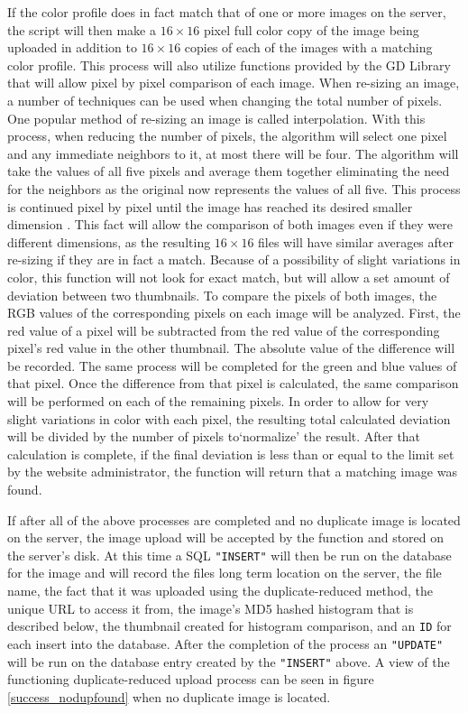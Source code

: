 If the color profile does in fact match that of one or more images on the server, the script will then make a $16\times16$ pixel full color copy of the image being uploaded in addition to $16\times16$ copies of each of the images with a matching color profile. This process will also utilize functions provided by the GD Library that will allow pixel by pixel comparison of each image. When re-sizing an image, a number of techniques can be used when changing the total number of pixels. One popular method of re-sizing an image is called interpolation. With this process, when reducing the number of pixels, the algorithm will select one pixel and any immediate neighbors to it, at most there will be four. The algorithm will take the values of all five pixels and average them together eliminating the need for the neighbors as the original now represents the values of all five. This process is continued pixel by pixel until the image has reached its desired smaller dimension \cite{Acharya:2007}. This fact will allow the comparison of both images even if they were different dimensions, as the resulting $16\times16$ files will have similar averages after re-sizing if they are in fact a match. Because of a possibility of slight variations in color, this function will not look for exact match, but will allow a set amount of deviation between two thumbnails. To compare the pixels of both images, the RGB values of the corresponding pixels on each image will be analyzed. First, the red value of a pixel will be subtracted from the red value of the corresponding pixel's red value in the other thumbnail. The absolute value of the difference will be recorded. The same process will be completed for the green and blue values of that pixel. Once the difference from that pixel is calculated, the same comparison will be performed on each of the remaining pixels. In order to allow for very slight variations in color with each pixel, the resulting total calculated deviation will be divided by the number of pixels to`normalize' the result. After that calculation is complete, if the final deviation is less than or equal to the limit set by the website administrator, the function will return that a matching image was found.

If after all of the above processes are completed and no duplicate image is located on the server, the image upload will be accepted by the function and stored on the server's disk. At this time a SQL {\tt "INSERT"} will then be run on the database for the image and will record the files long term location on the server, the file name, the fact that it was uploaded using the duplicate-reduced method, the unique URL to access it from, the image's MD5 hashed histogram that is described below, the thumbnail created for histogram comparison, and an {\tt ID} for each insert into the database. After the completion of the process an {\tt "UPDATE"} will be run on the database entry created by the {\tt "INSERT"} above. A view of the functioning duplicate-reduced upload process can be seen in figure \ref{success_nodupfound} when no duplicate image is located.

